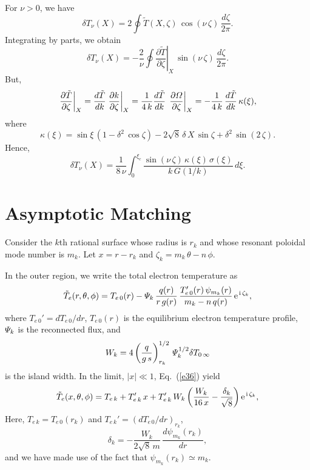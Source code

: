 \documentclass[12pt,prb,aps,notitlepage]{revtex4-1}
\begin{document}
For $\nu>0$, we have
\begin{equation}
\delta T_\nu(X) = 2\oint\tilde{T}(X,\zeta)\,\cos(\nu\,\zeta)\,\frac{d\zeta}{2\pi}.
\end{equation}
Integrating by parts, we obtain
\begin{equation}
\delta T_\nu(X) = -\frac{2}{\nu}\oint\left.\frac{\partial \tilde{T}}{\partial\zeta}\right|_X\,\sin(\nu\,\zeta)\,\frac{d\zeta}{2\pi}.
\end{equation}
But,
\begin{equation}
\left.\frac{\partial \tilde{T}}{\partial\zeta}\right|_X=\frac{d\tilde{T}}{dk}\left.\frac{\partial k}{\partial\zeta}\right|_{X}
=\frac{1}{4\,k}\frac{d\tilde{T}}{dk}\,\left.\frac{\partial {\mit\Omega}}{\partial\zeta}\right|_{X}=-\frac{1}{4\,k}\,\frac{d\tilde{T}}{dk}\,\kappa(\xi),
\end{equation}
where
\begin{equation}
\kappa(\xi) = \sin\xi\,(1-\delta^2\,\cos\zeta)  -2\sqrt{8}\,\delta\,X\,\sin\zeta +\delta^2\,\sin(2\,\zeta).
\end{equation}
Hence,
\begin{equation}
\delta T_\nu(X) =\frac{1}{8\,\nu}\int_0^{\xi_c}\frac{\sin(\nu\,\zeta)\,\kappa(\xi)\,\sigma(\xi)}{k\,G(1/k)}\,d\xi.
\end{equation}

\section{Asymptotic Matching}
Consider the $k$th rational surface whose radius is $r_k$ and whose resonant poloidal mode number is $m_k$. Let  $x=r-r_k$ and $\zeta_k=m_k\,\theta-n\,\phi$. 

 In the outer region,  we write the total electron temperature as 
\begin{equation}\label{e36}
\tilde{T}_e(r, \theta,\phi)=T_{e\,0}(r) - {\mit\Psi}_k\,\frac{q(r)}{r\,g(r)}\,\frac{T_{e\,0}'(r)\,\psi_{m_k}(r)}{m_k-n\,q(r)}\,{\rm e}^{\,{\rm i}\,\zeta_k},
\end{equation}
where $T_{e\,0}'=dT_{e\,0}/dr$, $T_{e\,0}(r)$ is the equilibrium electron temperature profile, ${\mit\Psi}_k$ is the reconnected flux, and 
\begin{equation}
W_k = 4\left(\frac{q}{g\,s}\right)^{1/2}_{r_k}\,{\mit\Psi}_k^{1/2}\delta T_{0\,\infty}
\end{equation}
is the island width.
 In the limit, $|x|\ll 1$, Eq.~(\ref{e36}) yield 
\begin{equation}
\tilde{T}_e(x, \theta,\phi)=T_{e\,k} + T_{e\,k}'\,x + T_{e\,k}'\,W_k\left(\frac{W_k}{16\,x} - \frac{\delta_k}{\sqrt{8}}\right){\rm e}^{\,{\rm i}\,\zeta_k},
\end{equation}
Here, $T_{e\,k}=T_{e\,0}(r_k)$ and $T_{e\,k}'= (dT_{e\,0}/dr)_{r_k}$, 
\begin{equation}
\delta_k =  -\frac{W_k}{2\sqrt{8}\,m}\,\frac{d\psi_{m_k}(r_k)}{dr},
\end{equation}
and we have made use of the fact that $\psi_{m_k}(r_k)\simeq m_k$. 
\end{document}
